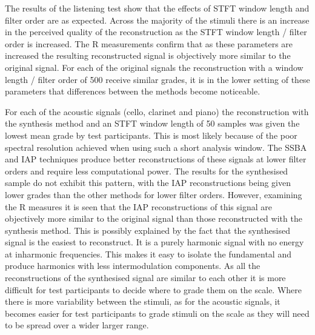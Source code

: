 %
%
		The results of the listening test show that the effects of STFT window length and filter order are as
		expected. Across the majority of the stimuli there is an increase in the perceived quality of the
		reconstruction as the STFT window length / filter order is increased. The R measurements
		confirm that as these parameters are increased the resulting reconstructed signal is objectively more
		similar to the original signal. For each of the original signals the reconstruction with a window length /
		filter order of 500 receive similar grades, it is in the lower setting of these parameters that differences
		between the methods become noticeable.

		For each of the acoustic signals (cello, clarinet and piano) the reconstruction with the synthesis method
		and an STFT window length of 50 samples was given the lowest mean grade by test participants. This is most
		likely because of the poor spectral resolution achieved when using such a short analysis window. The SSBA
		and IAP techniques produce better reconstructions of these signals at lower filter orders and require less
		computational power. The results for the synthesised sample do not exhibit this pattern, with the IAP
		reconstructions being given lower grades than the other methods for lower filter orders. However, examining
		the R measures it is seen that the IAP reconstructions of this signal are objectively more
		similar to the original signal than those reconstructed with the synthesis method. This is possibly
		explained by the fact that the synthesised signal is the easiest to reconstruct. It is a purely harmonic
		signal with no energy at inharmonic frequencies. This makes it easy to isolate the fundamental and produce
		harmonics with less intermodulation components. As all the reconstructions of the synthesised signal are
		similar to each other it is more difficult for test participants to decide where to grade them on the
		scale.  Where there is more variability between the stimuli, as for the acoustic signals, it becomes easier
		for test participants to grade stimuli on the scale as they will need to be spread over a wider larger
		range.

